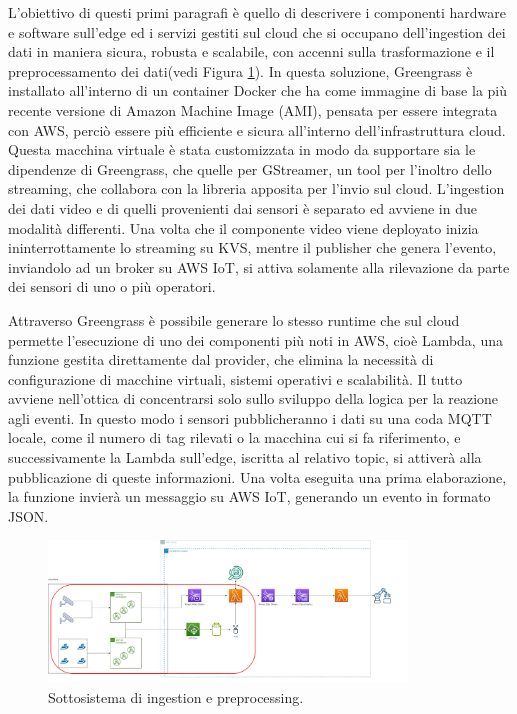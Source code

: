 L'obiettivo di questi primi paragrafi è quello di descrivere i componenti hardware e software sull’edge ed i servizi gestiti sul cloud che si occupano dell’ingestion dei dati in maniera sicura, robusta e scalabile, con accenni sulla trasformazione e il preprocessamento dei dati(vedi Figura \ref{fig:sub-ing}). In questa soluzione, Greengrass è installato all’interno di un container Docker che ha come immagine di base la più recente versione di Amazon Machine Image (AMI), pensata per essere integrata con AWS, perciò essere più efficiente e sicura all’interno dell’infrastruttura cloud. Questa macchina virtuale è stata customizzata in modo da supportare sia le dipendenze di Greengrass, che quelle per GStreamer, un tool per l’inoltro dello streaming, che collabora con la libreria apposita per l'invio sul cloud. L’ingestion dei dati video e di quelli provenienti dai sensori è separato ed avviene in due modalità differenti. Una volta che il componente video viene deployato inizia ininterrottamente lo streaming su KVS, mentre il publisher che genera l’evento, inviandolo ad un broker su AWS IoT, si attiva solamente alla rilevazione da parte dei sensori di uno o più operatori. 

Attraverso Greengrass è possibile generare lo stesso runtime che sul cloud permette l’esecuzione di uno dei componenti più noti in AWS, cioè Lambda, una funzione gestita direttamente dal provider, che elimina la necessità di configurazione di macchine virtuali, sistemi operativi e scalabilità. Il tutto avviene nell’ottica di concentrarsi solo sullo sviluppo della logica per la reazione agli eventi. In questo modo i sensori pubblicheranno i dati su una coda MQTT locale, come il numero di tag rilevati o la macchina cui si fa riferimento, e successivamente la Lambda sull'edge, iscritta al relativo topic, si attiverà alla pubblicazione di queste informazioni. Una volta eseguita una prima elaborazione, la funzione invierà un messaggio su AWS IoT, generando un evento in formato JSON. 

\begin{figure}[htbp]
    \centering
    \includegraphics[width=0.85\textwidth]{figures/sottosistema-ingestion.png}
    \caption{Sottosistema di ingestion e preprocessing.} 
    \label{fig:sub-ing}
\end{figure}


